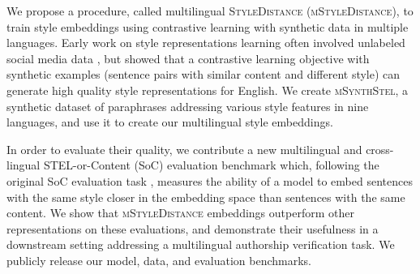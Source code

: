 We propose a procedure, called multilingual \textsc{StyleDistance} (\textsc{mStyleDistance}), to train style embeddings using contrastive learning with synthetic data in multiple languages. Early work on style representations learning often involved unlabeled social media data \citep{deepstyle, styleemb, luar, lisa}, but \citet{patel2024styledistancestrongercontentindependentstyle} showed that a contrastive learning objective with synthetic examples (sentence pairs with similar content and different style) can generate high quality style representations for English. 
We create \textsc{mSynthStel}, a synthetic dataset of paraphrases addressing various style features in nine languages, and use it to create our multilingual style embeddings.

In order to evaluate their quality, we contribute a new multilingual and cross-lingual STEL-or-Content (SoC) evaluation benchmark which, following the original SoC evaluation task \cite{styleemb}, measures the ability of a model to embed sentences with the same style closer in the embedding space than sentences with the same content. We show that \textsc{mStyleDistance} embeddings outperform other representations on these evaluations, and demonstrate their usefulness in a downstream setting addressing a multilingual authorship verification task. We publicly release our model, data, and evaluation benchmarks. 




